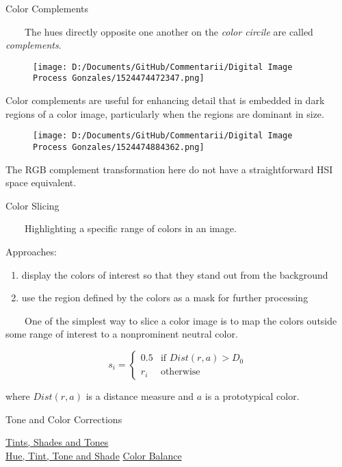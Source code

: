 \documentclass[]{article}
\begin{document}
Color Complements

\(\quad\quad\)The hues directly opposite one another on the \emph{color
circile} are called \emph{complements}.

\begin{figure}
\centering
\texttt{[image: D:/Documents/GitHub/Commentarii/Digital Image Process Gonzales/1524474472347.png]}
\caption{}
\end{figure}

Color complements are useful for enhancing detail that is embedded in
dark regions of a color image, particularly when the regions are
dominant in size.

\begin{figure}
\centering
\texttt{[image: D:/Documents/GitHub/Commentarii/Digital Image Process Gonzales/1524474884362.png]}
\caption{}
\end{figure}

The RGB complement transformation here do not have a straightforward HSI
space equivalent.

Color Slicing

\(\quad\quad\)Highlighting a specific range of colors in an image.

Approaches: \\

\begin{enumerate}
\def\labelenumi{\arabic{enumi}.}
\item
  display the colors of interest so that they stand out from the
  background 
\item
  use the region defined by the colors as a mask for further processing
\end{enumerate}

\(\quad\quad\)One of the simplest way to slice a color image is to map
the colors outside some range of interest to a nonprominent neutral
color.

\[s_i=\begin{cases}0.5 &\text{if } Dist(r,a)>D_0\\
r_i&\text{otherwise}\end{cases}\]

where \(Dist(r,a)\) is a distance measure and \(a\) is a prototypical
color.

Tone and Color Corrections

\href{https://en.wikipedia.org/wiki/Tints_and_shades}{Tints, Shades and
Tones}\\
 \href{https://color-wheel-artist.com/hue/}{Hue, Tint, Tone and Shade}
\href{https://en.wikipedia.org/wiki/Color_balance}{Color Balance}\\
\end{document}
